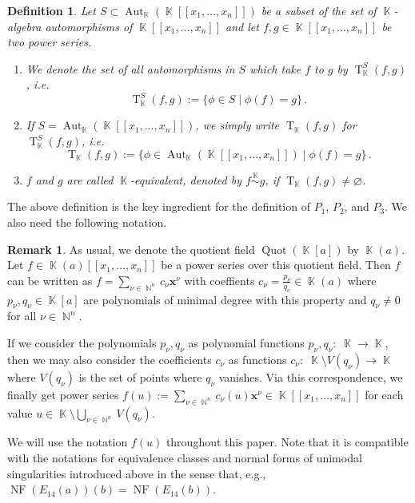 \documentclass[noend]{amsproc}
\newtheorem{defn}[theorem]{Definition}
\theoremstyle{definition}
\newtheorem{remark}[theorem]{Remark}
\newcommand{\NF}[1]{\operatorname{NF}(#1)}
\DeclareMathOperator{\N}{\mathbb{N}}
\DeclareMathOperator{\K}{\mathbb{K}}
\DeclareMathOperator{\T}{T}
\DeclareMathOperator{\Aut}{Aut}
\DeclareMathOperator{\Quot}{Quot}
\begin{document}
\begin{defn}
Let $S \subset \Aut_{\K}(\K[[x_1,\ldots,x_n]])$ be a subset of the set of
$\K$-algebra automorphisms of $\K[[x_1, \ldots, x_n]]$ and let
$f, g \in \K[[x_1, \ldots, x_n]]$ be two power series.
\begin{enumerate}
\item We denote the set of all automorphisms in $S$ which take $f$ to $g$ by
$\T_{\K}^S(f,g)$, i.e.\@
\[
\T_{\K}^S(f,g):=\{\phi\in S\mid \phi(f)=g\}\,.
\]

\item If $S=\Aut_{\K}(\K[[x_1,\ldots,x_n]])$, we simply write
$\T_{\K}(f,g)$ for $\T_{\K}^S(f,g)$, i.e.\@
\[
\T_{\K}(f,g)
:= \{\phi \in \Aut_{\K}(\K[[x_1, \ldots, x_n]]) \mid \phi(f) = g \} \,.
\]

\item $f$ and $g$ are called $\K$-equivalent, denoted by
$f \overset{\K}\sim g$, if $\T_{\K}(f,g) \neq \varnothing$.
\end{enumerate}
\end{defn}

The above definition is the key ingredient for the definition of $P_1$, $P_2$,
and $P_3$. We also need the following notation.

\begin{remark}
As usual, we denote the quotient field
$\Quot(\K[a])$ by $\K(a)$. Let $f \in \K(a)[[x_1,\ldots,x_n]]$ be a power
series over this quotient field. Then $f$ can be written as
$f = \sum_{\nu \in \N^n} c_\nu \boldsymbol{x}^\nu$ with coeffients
$c_\nu = \frac{p_\nu}{q_\nu} \in \K(a)$ where $p_\nu, q_\nu \in \K[a]$ are
polynomials of minimal degree with this property and $q_\nu \neq 0$ for all
$\nu \in \N^n$.

If we consider the polynomials $p_\nu, q_\nu$ as polynomial functions
$p_\nu, q_\nu: \; \K \rightarrow \K$, then we may also consider the
coefficients $c_\nu$ as functions
$c_\nu: \; \K \setminus V(q_\nu) \rightarrow \K$ where $V(q_\nu)$ is the set of
points where $q_\nu$ vanishes. Via this correspondence, we finally get power
series
$f(u) := \sum_{\nu \in \N^n} c_\nu(u) \boldsymbol{x}^\nu
\in \K[[x_1,\ldots,x_n]]$ for each value
$u \in \K \setminus \bigcup_{\nu \in \N^n} V(q_\nu)$.

We will use the notation $f(u)$ throughout this paper. Note that it is
compatible with the notations for equivalence classes and normal forms of
unimodal singularities introduced above in the sense that, e.g.,
$\NF{E_{14}(a)}(b) = \NF{E_{14}(b)}$.
\end{remark}
\end{document}
